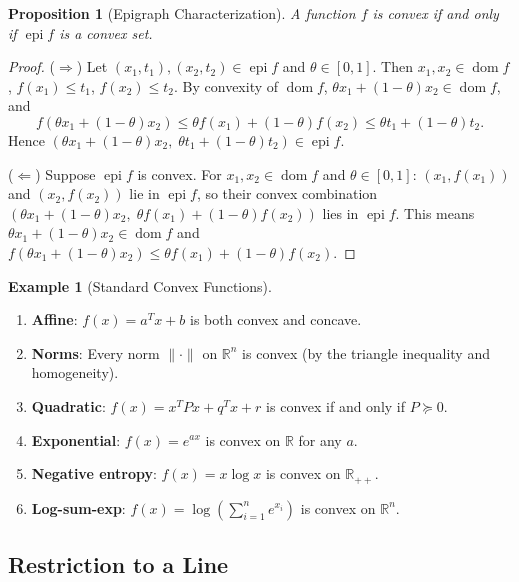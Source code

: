 \documentclass[11pt,a4paper]{article}
\newtheorem{proposition}[theorem]{Proposition}
\theoremstyle{definition}
\newtheorem{example}[theorem]{Example}
\theoremstyle{remark}
\newcommand{\R}{\mathbb{R}}
\DeclareMathOperator{\dom}{dom}
\DeclareMathOperator{\epi}{epi}
\begin{document}
\begin{proposition}[Epigraph Characterization]
\label{prop:epigraph}
A function $f$ is convex if and only if $\epi f$ is a convex set.
\end{proposition}

\begin{proof}
($\Rightarrow$) Let $(x_1, t_1), (x_2, t_2) \in \epi f$ and $\theta \in [0,1]$. Then
$x_1, x_2 \in \dom f$, $f(x_1) \le t_1$, $f(x_2) \le t_2$. By convexity of $\dom f$,
$\theta x_1 + (1-\theta) x_2 \in \dom f$, and
\[
  f(\theta x_1 + (1-\theta) x_2) \le \theta f(x_1) + (1-\theta) f(x_2)
  \le \theta t_1 + (1-\theta) t_2.
\]
Hence $(\theta x_1 + (1-\theta) x_2, \; \theta t_1 + (1-\theta) t_2) \in \epi f$.

($\Leftarrow$) Suppose $\epi f$ is convex. For $x_1, x_2 \in \dom f$ and
$\theta \in [0,1]$: $(x_1, f(x_1))$ and $(x_2, f(x_2))$ lie in $\epi f$, so their
convex combination $(\theta x_1 + (1-\theta) x_2, \; \theta f(x_1) + (1-\theta) f(x_2))$
lies in $\epi f$. This means $\theta x_1 + (1-\theta) x_2 \in \dom f$ and $f(\theta x_1
+ (1-\theta) x_2) \le \theta f(x_1) + (1-\theta) f(x_2)$.
\end{proof}

\begin{example}[Standard Convex Functions]
\label{ex:standard-convex}
\begin{enumerate}[label=(\alph*)]
  \item \textbf{Affine}: $f(x) = a^T x + b$ is both convex and concave.
  \item \textbf{Norms}: Every norm $\|\cdot\|$ on $\R^n$ is convex (by the triangle
        inequality and homogeneity).
  \item \textbf{Quadratic}: $f(x) = x^T P x + q^T x + r$ is convex if and only if
        $P \succeq 0$.
  \item \textbf{Exponential}: $f(x) = e^{ax}$ is convex on $\R$ for any $a$.
  \item \textbf{Negative entropy}: $f(x) = x \log x$ is convex on $\R_{++}$.
  \item \textbf{Log-sum-exp}: $f(x) = \log(\sum_{i=1}^n e^{x_i})$ is convex on $\R^n$.
\end{enumerate}
\end{example}

\subsection{Restriction to a Line}
\end{document}
